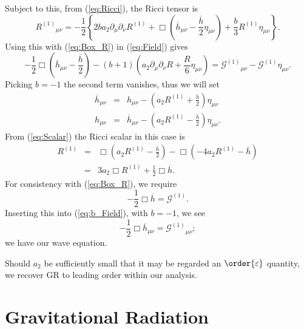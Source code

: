 \documentclass[aps,prd,reprint,showpacs]{revtex4-1}
\newcommand{\eqnref}[1]{(\ref{eq:#1})}
\newcommand{\recip}[1]{\ensuremath{\frac{1}{#1}}}
\begin{document}
Subject to this, from \eqnref{Ricci}, the Ricci tensor is
\begin{equation}
{R^{(1)}}_{\mu\nu} = -\frac{1}{2}\left\{2b a_2 \partial_\mu\partial_\nu R^{(1)} + \Box\left(\overline{h}_{\mu\nu} -\frac{\overline{h}}{2}\eta_{\mu\nu}\right) + \frac{b}{3}R^{(1)}\eta_{\mu\nu}\right\}.
\end{equation}
Using this with \eqnref{Box_R} in \eqnref{Field} gives
\begin{equation}
-\frac{1}{2}\Box\left(\overline{h}_{\mu\nu} - \frac{\overline{h}}{2}\right) - (b + 1)\left(a_2\partial_\mu\partial_\nu R + \frac{R}{6}\eta_{\mu\nu}\right) = {\mathcal{G}^{(1)}}_{\mu\nu} - \mathcal{G}^{(1)}\eta_{\mu\nu}.
\label{eq:b_Field}
\end{equation}
Picking $b = -1$ the second term vanishes, thus we will set\cite{Corda2007, Capozziello2008}
\begin{eqnarray}
\overline{h}_{\mu\nu} & = & h_{\mu\nu} - \left(a_2 R^{(1)} + \frac{h}{2}\right)\eta_{\mu\nu}\\
h_{\mu\nu} & = & \overline{h}_{\mu\nu} - \left(a_2 R^{(1)} -\frac{\overline{h}}{2}\right)\eta_{\mu\nu}.
\label{eq:h_metric}
\end{eqnarray}
From \eqnref{Scalar} the Ricci scalar in this case is 
\begin{eqnarray}
R^{(1)} & = & \Box \left(a_2 R^{(1)} -\frac{\overline{h}}{2}\right) - \Box (-4 a_2 R^{(1)} - \overline{h}) \nonumber \\
 & = & 3a_2 \Box R^{(1)} + \frac{1}{2}\Box \overline{h}.
\label{eq:Ricci_Box_h}
\end{eqnarray}
For consistency with \eqnref{Box_R}, we require
\begin{equation}
-\recip{2}\Box \overline{h} = \mathcal{G}^{(1)}.
\label{eq:Box_h}
\end{equation}
Inserting this into \eqnref{b_Field}, with $b = -1$, we see
\begin{equation}
-\recip{2}\Box \overline{h}_{\mu\nu} = {\mathcal{G}^{(1)}}_{\mu\nu};
\label{eq:Box_hmunu}
\end{equation}
we have our wave equation.

Should $a_2$ be sufficiently small that it may be regarded an $\order{\varepsilon}$ quantity, we recover GR to leading order within our analysis.

\section{Gravitational Radiation}
\end{document}

